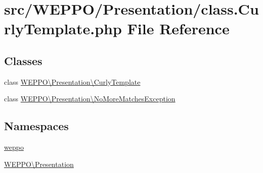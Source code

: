 \hypertarget{class_8CurlyTemplate_8php}{}\section{src/\+W\+E\+P\+P\+O/\+Presentation/class.Curly\+Template.\+php File Reference}
\label{class_8CurlyTemplate_8php}
\subsection*{Classes}
\begin{DoxyCompactItemize}
\item 
class \hyperlink{classWEPPO_1_1Presentation_1_1CurlyTemplate}{W\+E\+P\+P\+O\textbackslash{}\+Presentation\textbackslash{}\+Curly\+Template}
\item 
class \hyperlink{classWEPPO_1_1Presentation_1_1NoMoreMatchesException}{W\+E\+P\+P\+O\textbackslash{}\+Presentation\textbackslash{}\+No\+More\+Matches\+Exception}
\end{DoxyCompactItemize}
\subsection*{Namespaces}
\begin{DoxyCompactItemize}
\item 
 \hyperlink{namespaceweppo}{weppo}
\item 
 \hyperlink{namespaceWEPPO_1_1Presentation}{W\+E\+P\+P\+O\textbackslash{}\+Presentation}
\end{DoxyCompactItemize}
